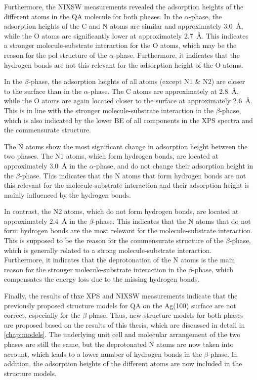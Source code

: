 Furthermore, the \ac{NIXSW} measurements revealed the adsorption heights of the different atoms in the \ac{QA} molecule for both phases. In the $\alpha$-phase, the adsorption heights of the C and N atoms are similar and approximately 3.0~\si{\angstrom}, while the O atoms are significantly lower at approximately 2.7~\si{\angstrom}. This indicates a stronger molecule-substrate interaction for the O atoms, which may be the reason for the \ac{pol} structure of the $\alpha$-phase. Furthermore, it indicates that the hydrogen bonds are not this relevant for the adsorption height of the O atoms. 

In the $\beta$-phase, the adsorption heights of all atoms (except N1 \& N2) are closer to the surface than in the $\alpha$-phase. The C atoms are approximately at 2.8~\si{\angstrom}, while the O atoms are again located closer to the surface at approximately 2.6~\si{\angstrom}. This is in line with the stronger molecule-substrate interaction in the $\beta$-phase, which is also indicated by the lower \ac{BE} of all components in the \ac{XPS} spectra and the commensurate structure. 

The N atoms show the most significant change in adsorption height between the two phases. The N1 atoms, which form hydrogen bonds, are located at approximately 3.0~\si{\angstrom} in the $\alpha$-phase, and do not change their adsorption height in the $\beta$-phase. This indicates that the N atoms that form hydrogen bonds are not this relevant for the molecule-substrate interaction and their adsorption height is mainly influenced by the hydrogen bonds.

In contrast, the N2 atoms, which do not form hydrogen bonds, are located at approximately 2.4~\si{\angstrom} in the $\beta$-phase. This indicates that the N atoms that do not form hydrogen bonds are the most relevant for the molecule-substrate interaction. This is supposed to be the reason for the commensurate structure of the $\beta$-phase, which is generally related to a strong molecule-substrate interaction. Furthermore, it indicates that the deprotonation of the N atoms is the main reason for the stronger molecule-substrate interaction in the $\beta$-phase, which compensates the energy loss due to the missing hydrogen bonds.


Finally, the results of thxe \ac{XPS} and \ac{NIXSW} measurements indicate that the previously proposed structure models for \ac{QA} on the Ag(100) surface are not correct, especially for the $\beta$-phase. Thus, new structure models for both phases are proposed based on the results of this thesis, which are discussed in detail in \autoref{chap:models}. The underlying unit cell and molecular arrangement of the two phases are still the same, but the deprotonated N atoms are now taken into account, which leads to a lower number of hydrogen bonds in the $\beta$-phase. In addition, the adsorption heights of the different atoms are now included in the structure models.


